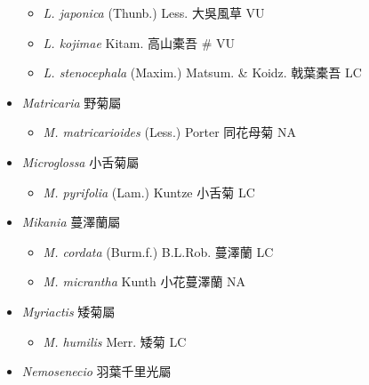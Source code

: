 \begin{itemize}
  \begin{itemize}
        \item[] \textit{L. japonica} (Thunb.) Less.  大吳風草   VU
        \item[] \textit{L. kojimae} Kitam.  高山橐吾  \# VU
        \item[] \textit{L. stenocephala} (Maxim.) Matsum. \& Koidz.  戟葉橐吾   LC
  \end{itemize}
 \item[] \textit{Matricaria} 野菊屬
                                
  \begin{itemize}
        \item[] \textit{M. matricarioides} (Less.) Porter  同花母菊   NA
  \end{itemize}
 \item[] \textit{Microglossa} 小舌菊屬
                                
  \begin{itemize}
        \item[] \textit{M. pyrifolia} (Lam.) Kuntze  小舌菊   LC
  \end{itemize}
 \item[] \textit{Mikania} 蔓澤蘭屬
                                
  \begin{itemize}
        \item[] \textit{M. cordata} (Burm.f.) B.L.Rob.  蔓澤蘭   LC
        \item[] \textit{M. micrantha} Kunth  小花蔓澤蘭   NA
  \end{itemize}
 \item[] \textit{Myriactis} 矮菊屬
                                
  \begin{itemize}
        \item[] \textit{M. humilis} Merr.  矮菊   LC
  \end{itemize}
 \item[] \textit{Nemosenecio} 羽葉千里光屬
                                

\end{itemize}
